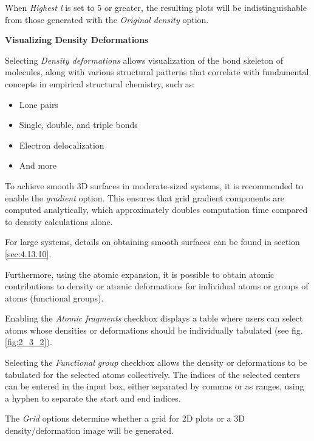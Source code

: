 \documentclass[10pt]{article}
\begin{document}
When {\it Highest l} is set to 5 or greater,
the resulting plots will be indistinguishable from those generated with the {\it Original density} option.

\vspace*{3mm}
{\bf Visualizing Density Deformations}
\vspace*{3mm}

Selecting {\it Density deformations} allows visualization of the bond skeleton of molecules,
along with various structural patterns that correlate with fundamental concepts in empirical structural chemistry,
such as:

\begin{itemize}
\item Lone pairs
\item Single, double, and triple bonds
\item Electron delocalization
\item And more
\end{itemize}

To achieve smooth 3D surfaces in moderate-sized systems, it is recommended
to enable the {\it gradient} option.
This ensures that grid gradient components are computed analytically,
which approximately doubles computation time compared to density calculations alone.

For large systems, details on obtaining smooth surfaces
can be found in section \ref{sec:4.13.10}.

Furthermore, using the atomic expansion, it is possible to obtain atomic contributions to density
or atomic deformations for individual atoms or groups of atoms (functional groups).

Enabling the {\it Atomic fragments} checkbox displays a table
where users can select atoms whose densities or deformations
should be individually tabulated (see fig. \ref{fig:2_3_2}).

Selecting the {\it Functional group} checkbox allows the density or deformations
to be tabulated for the selected atoms collectively.
The indices of the selected centers can be entered in the input box,
either separated by commas or as ranges, using a hyphen to separate the start and end indices.

The {\it Grid} options determine whether a grid for 2D plots
or a 3D density/deformation image will be generated.
\end{document}
